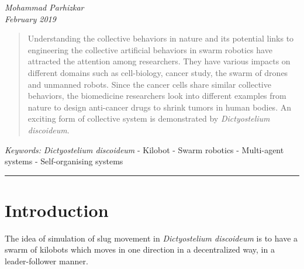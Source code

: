 \documentclass[11pt,a4paper]{article}
\begin{document}
\begin{center}
{ }
\vspace{2mm}

{\selectfont\textit{Mohammad Parhizkar \\ \small{February 2019} }}


\end{center}
\begin{abstract}
Understanding the collective behaviors in nature and its potential links to engineering the collective artificial behaviors in swarm robotics have attracted the attention among researchers. They have various impacts on different domains such as cell-biology, cancer study, the swarm of drones and unmanned robots. Since the cancer cells share similar collective behaviors, the biomedicine researchers look into different examples from nature to design anti-cancer drugs to shrink tumors in human bodies. An exciting form of collective system is demonstrated by {\textit{Dictyostelium discoideum}}. 

   \end{abstract}

{\footnotesize\textit{Keywords:} {\textit{Dictyostelium discoideum}} - Kilobot - Swarm robotics - Multi-agent systems - Self-organising systems}

{\begin{center}\noindent\rule{14cm}{0.4pt}\end{center}}
\section{Introduction}
The idea of simulation of slug movement in \textit{Dictyostelium discoideum} is to have a swarm of kilobots which moves in one direction in a decentralized way, in a leader-follower manner.
\end{document}

